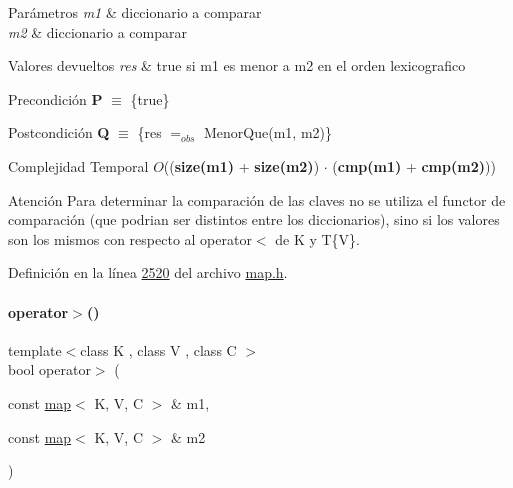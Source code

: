 \begin{DoxyParams}{Parámetros}
{\em m1} & diccionario a comparar \\
\hline
{\em m2} & diccionario a comparar \\
\hline
\end{DoxyParams}

\begin{DoxyRetVals}{Valores devueltos}
{\em res} & true si m1 es menor a m2 en el orden lexicografico\\
\hline
\end{DoxyRetVals}
\begin{DoxyPrecond}{Precondición}
{\bfseries P} $\equiv$ \{true\} 
\end{DoxyPrecond}
\begin{DoxyPostcond}{Postcondición}
{\bfseries Q} $\equiv$ \{res $=_{obs}$ Menor\+Que(m1, m2)\}
\end{DoxyPostcond}

\begin{DoxyDescription}
\item[Complejidad Temporal]$O$(({\bfseries size(m1)} + {\bfseries size(m2)}) $\cdot$ ({\bfseries cmp(m1)} + {\bfseries cmp(m2)}))
\end{DoxyDescription}

\begin{DoxyAttention}{Atención}
Para determinar la comparación de las claves no se utiliza el functor de comparación (que podrian ser distintos entre los diccionarios), sino si los valores son los mismos con respecto al operator$<$ de K y T\{V\}. 
\end{DoxyAttention}


Definición en la línea \hyperlink{map_8h_source_l02520}{2520} del archivo \hyperlink{map_8h_source}{map.\+h}.

\mbox{\label{classaed2_1_1map_a2000cd874b72034ce7fe730c811b6c63_a2000cd874b72034ce7fe730c811b6c63}} 
\paragraph{\texorpdfstring{operator$>$()}{operator>()}}
{\footnotesize\ttfamily template$<$class K , class V , class C $>$ \\
bool operator$>$ (\begin{DoxyParamCaption}\item[{const \hyperlink{classaed2_1_1map}{map}$<$ K, V, C $>$ \&}]{m1,  }\item[{const \hyperlink{classaed2_1_1map}{map}$<$ K, V, C $>$ \&}]{m2 }\end{DoxyParamCaption})\hspace{0.3cm}{\ttfamily [related]}}




